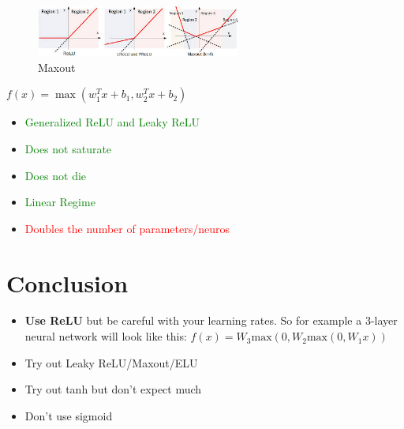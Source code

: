 \begin{figure}[!htb]
  \centering
  \includegraphics[width=0.6\textwidth]{Images/activation_f/7.jpg}
  \caption{Maxout}
\end{figure}
$f(x) = \max(w_1^Tx+b_1,w_2^Tx+b_2)$
\begin{itemize}
\item \textcolor{green}{Generalized ReLU and Leaky ReLU}
\item \textcolor{green}{Does not saturate}
\item \textcolor{green}{Does not die}
\item \textcolor{green}{Linear Regime}

\item \textcolor{red}{Doubles the number of parameters/neuros}
\end{itemize}

\section*{Conclusion}
\begin{itemize}
\item \textbf{Use ReLU} but be careful with your learning rates. So for example a 3-layer neural network will look like this: $f(x) = W_3 \text{max} (0,W_2 \text{max} (0, W_1x))$
\item Try out Leaky ReLU/Maxout/ELU
\item Try out tanh but don't expect much
\item Don't use sigmoid
\end{itemize}
